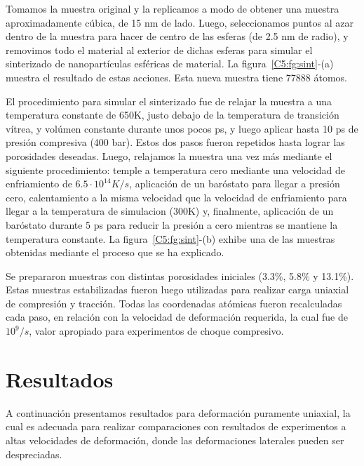 Tomamos la muestra original y la replicamos a modo de obtener una muestra aproximadamente cúbica, de 15 nm de lado. Luego, seleccionamos puntos
al azar dentro de la muestra para hacer de centro de las esferas (de 2.5 nm de radio), y removimos todo el material al exterior de dichas esferas
para simular el sinterizado de nanopartículas esféricas de material. La figura~\ref{C5:fg:sint}-(a) muestra el resultado de estas acciones. Esta
nueva muestra tiene 77888 átomos.

El procedimiento para simular el sinterizado fue de relajar la muestra a una temperatura constante de 650K, justo debajo de la temperatura
de transición vítrea, y volúmen constante durante unos pocos ps, y luego aplicar hasta 10 ps de presión compresiva (400 bar). Estos dos pasos
fueron repetidos hasta lograr las porosidades deseadas. Luego, relajamos la muestra una vez más mediante el siguiente procedimiento: temple a 
temperatura cero mediante una velocidad de enfriamiento de $6.5 \cdot 10^{14} K/s$, aplicación de un baróstato para llegar a presión
cero, calentamiento a la misma velocidad que la velocidad de enfriamiento para llegar a la temperatura de simulacion (300K) y,
finalmente, aplicación de un baróstato durante 5 ps para reducir la presión a cero mientras se mantiene la temperatura constante. La 
figura~\ref{C5:fg:sint}-(b) exhibe una de las muestras obtenidas mediante el proceso que se ha explicado.

Se prepararon muestras con distintas porosidades iniciales (3.3\%, 5.8\% y 13.1\%). Estas muestras estabilizadas fueron luego utilizadas
para realizar carga uniaxial de compresión y tracción. Todas las coordenadas atómicas fueron recalculadas cada paso, en relación con la
velocidad de deformación requerida, la cual fue de $10^9 /s$, valor apropiado para experimentos de choque compresivo.


\section{Resultados}
\label{S5_3}

A continuación presentamos resultados para deformación puramente uniaxial, la cual es adecuada para realizar comparaciones con resultados de
experimentos a altas velocidades de deformación, donde las deformaciones laterales pueden ser despreciadas.

